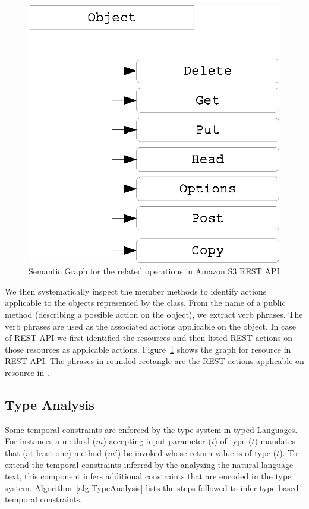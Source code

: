 \begin{figure}
	\centering
		\includegraphics[scale=0.4]{KnowledgeGraph.eps}
	\caption{Semantic Graph for the  related operations in Amazon S3 REST API}
	\label{fig:knowledge}
\end{figure} 

We then systematically inspect the member methods to identify actions applicable to the objects represented by the class. From the name of a public method (describing a possible action on the object), we extract verb phrases. The verb phrases are used as the associated actions applicable on the object. In case of REST API we first identified the resources and then listed REST actions on those resources as applicable actions. Figure~\ref{fig:knowledge} shows the graph for  resource in REST API. The phrases in rounded rectangle are the REST actions applicable on  resource in \amazonAPI.
  

\subsection{Type Analysis}

Some temporal constraints are enforced by the type system in typed Languages.
For instances a method ($m$) accepting input parameter ($i$) of type ($t$) mandates that (at least one) method ($m'$) be invoked whose return value is of type ($t$).
To extend the temporal constraints inferred by the analyzing the natural language text, this component infers additional constraints that are encoded
in the type system. Algorithm~\ref{alg:TypeAnalysis} lists the steps followed to infer type based temporal constraints.

